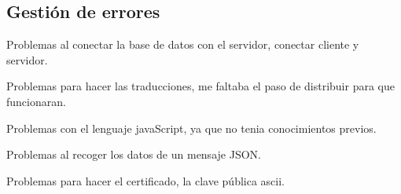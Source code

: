 \subsection*{Gestión de errores}


\begin{DoxyItemize}
\item Problemas al conectar la base de datos con el servidor, conectar cliente y servidor.
\item Problemas para hacer las traducciones, me faltaba el paso de distribuir para que funcionaran.
\item Problemas con el lenguaje java\+Script, ya que no tenia conocimientos previos.
\item Problemas al recoger los datos de un mensaje J\+S\+ON.
\item Problemas para hacer el certificado, la clave pública ascii. 
\end{DoxyItemize}